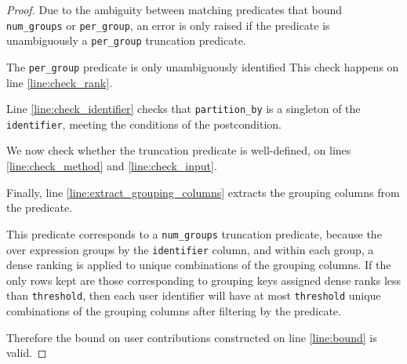 \documentclass{article}
\begin{document}
\begin{proof}
    Due to the ambiguity between matching predicates that bound \texttt{num\_groups} or \texttt{per\_group},
    an error is only raised if the predicate is unambiguously a \texttt{per\_group} truncation predicate.
    
    
    The \texttt{per\_group} predicate is only unambiguously identified 
    This check happens on line \ref{line:check_rank}.

    Line \ref{line:check_identifier} checks that \texttt{partition\_by} is a singleton of the \texttt{identifier}, meeting the conditions of the postcondition.

    We now check whether the truncation predicate is well-defined, on lines \ref{line:check_method} and \ref{line:check_input}.

    Finally, line \ref{line:extract_grouping_columns} extracts the grouping columns from the predicate.

    This predicate corresponds to a \texttt{num\_groups} truncation predicate,
    because the over expression groups by the \texttt{identifier} column,
    and within each group, a dense ranking is applied to unique combinations of the grouping columns.
    If the only rows kept are those corresponding to grouping keys assigned dense ranks less than \texttt{threshold},
    then each user identifier will have at most \texttt{threshold} unique combinations of the grouping columns
    after filtering by the predicate.

    Therefore the bound on user contributions constructed on line \ref{line:bound} is valid.
\end{proof}
\end{document}
